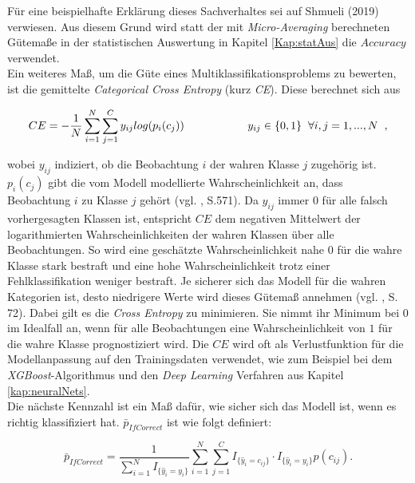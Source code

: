 \documentclass[a4paper,11pt]{article}
\begin{document}
Für eine beispielhafte Erklärung dieses Sachverhaltes sei auf Shmueli (2019) verwiesen. Aus diesem Grund wird statt der mit \textit{Micro-Averaging} berechneten Gütemaße in der statistischen Auswertung in Kapitel \ref{Kap:statAus} die $Accuracy$ verwendet.\\

Ein weiteres Maß, um die Güte eines Multiklassifikationsproblems zu bewerten, ist die gemittelte \textit{Categorical Cross Entropy} (kurz \textit{CE}). Diese berechnet sich aus

\[ CE = - \frac{1}{N}\sum_{i=1}^N \sum_{j = 1}^C y_{ij} log(p_i(c_j)) \hspace{2cm} y_{ij} \in \{0,1\} \hspace{0.2cm} \forall i, j = 1,...,N \hspace{0.2cm} ,\]

wobei $y_{ij}$ indiziert, ob die Beobachtung $i$ der wahren Klasse $j$ zugehörig ist. $p_i(c_j)$ gibt die vom Modell modellierte Wahrscheinlichkeit an, dass Beobachtung $i$ zu Klasse $j$ gehört (vgl. \cite{murphy}, S.571). Da $y_{ij}$ immer $0$ für alle falsch vorhergesagten Klassen ist, entspricht $CE$ dem negativen Mittelwert der logarithmierten Wahrscheinlichkeiten der wahren Klassen über alle Beobachtungen. So wird eine geschätzte Wahrscheinlichkeit nahe $0$ für die wahre Klasse stark bestraft und eine hohe Wahrscheinlichkeit trotz einer Fehlklassifikation weniger bestraft. Je sicherer sich das Modell für die wahren Kategorien ist, desto niedrigere Werte wird dieses Gütemaß annehmen (vgl. \cite{proMachine}, S. 72). 
Dabei gilt es die \textit{Cross Entropy} zu minimieren. Sie nimmt ihr Minimum bei $0$ im Idealfall an, wenn für alle Beobachtungen eine Wahrscheinlichkeit von $1$ für die wahre Klasse prognostiziert wird. Die $CE$ wird oft als Verlustfunktion für die Modellanpassung auf den Trainingsdaten verwendet, wie zum Beispiel bei dem \textit{XGBoost}-Algorithmus und den \textit{Deep Learning} Verfahren aus Kapitel \ref{kap:neuralNets}. \\
Die nächste Kennzahl ist ein Maß dafür, wie sicher sich das Modell ist, wenn es richtig klassifiziert hat. $\bar{p}_{IfCorrect}$ ist wie folgt definiert:

\[\bar{p}_{IfCorrect} = \frac{1}{\sum_{i=1}^N I_{\{\hat{y}_i = y_i\}}}\sum_{i=1}^N \sum_{j=1}^C I_{\{\hat{y}_i = c_{ij}\}} \cdot I_{\{\hat{y}_i = y_i\}} p(c_{ij}). \]
\end{document}
